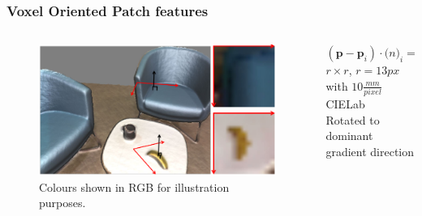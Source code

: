 \documentclass[mathserif, 10pt]{beamer}
\begin{document}
\begin{frame}
\frametitle{Voxel Oriented Patch features}

\begin{columns}
 \begin{column}{0.5\textwidth}
  \begin{figure}
  \center
  \includegraphics[width=\textwidth]{figures/vop}
  \caption{Colours shown in RGB for illustration purposes.}
  \label{fig:vop}
\end{figure}
 \end{column}
 \begin{column}{0.5\textwidth}
    $(\mathbf{p} - \mathbf{p}_i) \cdot \mathbf(n)_i = 0$ \\
    $r \times r$, $r = 13px$ with $10\frac{mm}{pixel}$\\
    CIELab\\
    Rotated to dominant gradient direction
 \end{column}
\end{columns}


\end{frame}
\end{document}
